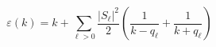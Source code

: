 \begin{equation}
\varepsilon (k) = k + \sum_{\ell >0} \frac{|S_{\ell}|^2}{2} \left( \frac{1}{k-q_{\ell}}+ \frac{1}{k+q_{\ell}}\right)
\label{t7}
\end{equation}

